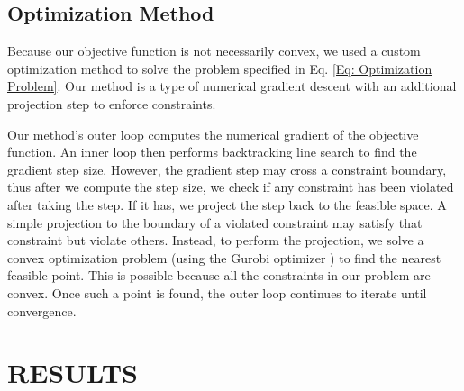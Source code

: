\subsection{Optimization Method}

Because our objective function is not necessarily convex, we used a custom optimization method to solve the problem specified in Eq. \ref{Eq: Optimization Problem}. Our method is a type of numerical gradient descent with an additional projection step to enforce constraints.

Our method's outer loop computes the numerical gradient of the objective function. An inner loop then performs backtracking line search to find the gradient step size. However, the gradient step may cross a constraint boundary, thus after we compute the step size, we check if any constraint has been violated after taking the step. If it has, we project the step back to the feasible space. A simple projection to the boundary of a violated constraint may satisfy that constraint but violate others. Instead, to perform the projection, we solve a convex optimization problem (using the Gurobi optimizer \cite{Gurobi2017}) to find the nearest feasible point. This is possible because all the constraints in our problem are convex. Once such a point is found, the outer loop continues to iterate until convergence.










\section{RESULTS}






